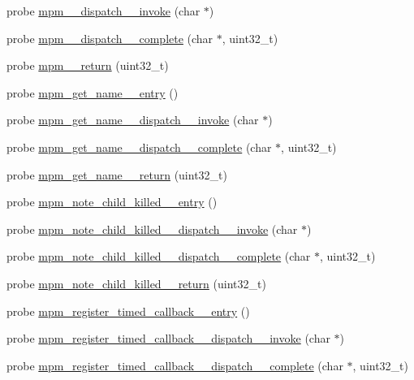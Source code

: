 \begin{DoxyCompactItemize}
\item 
probe \hyperlink{apache__probes_8d_a8e152825f105e3df19b568e1e9928b1d}{mpm\+\_\+\+\_\+dispatch\+\_\+\+\_\+invoke} (char $\ast$)
\item 
probe \hyperlink{apache__probes_8d_ae30fd1a26ab1cc9a489e66fb2812a6a2}{mpm\+\_\+\+\_\+dispatch\+\_\+\+\_\+complete} (char $\ast$, uint32\+\_\+t)
\item 
probe \hyperlink{apache__probes_8d_a5db8c32d33021094dc6b84aaee7dff3b}{mpm\+\_\+\+\_\+return} (uint32\+\_\+t)
\item 
probe \hyperlink{apache__probes_8d_a18460249d49260f04a3bffe61df15a20}{mpm\+\_\+get\+\_\+name\+\_\+\+\_\+entry} ()
\item 
probe \hyperlink{apache__probes_8d_a95717d031d2477163510b6ffd4e4e78b}{mpm\+\_\+get\+\_\+name\+\_\+\+\_\+dispatch\+\_\+\+\_\+invoke} (char $\ast$)
\item 
probe \hyperlink{apache__probes_8d_a68a2c5efe00c2a5c6d79ebd04a273fb3}{mpm\+\_\+get\+\_\+name\+\_\+\+\_\+dispatch\+\_\+\+\_\+complete} (char $\ast$, uint32\+\_\+t)
\item 
probe \hyperlink{apache__probes_8d_a55e51232195b97cbcf93f26dc6a870a4}{mpm\+\_\+get\+\_\+name\+\_\+\+\_\+return} (uint32\+\_\+t)
\item 
probe \hyperlink{apache__probes_8d_af2ec7faf474264c9a99c69f221579431}{mpm\+\_\+note\+\_\+child\+\_\+killed\+\_\+\+\_\+entry} ()
\item 
probe \hyperlink{apache__probes_8d_a21288220bcfa1d720595ff77a668eee8}{mpm\+\_\+note\+\_\+child\+\_\+killed\+\_\+\+\_\+dispatch\+\_\+\+\_\+invoke} (char $\ast$)
\item 
probe \hyperlink{apache__probes_8d_a6eca4314ac5073d03a6ab960b3a9db22}{mpm\+\_\+note\+\_\+child\+\_\+killed\+\_\+\+\_\+dispatch\+\_\+\+\_\+complete} (char $\ast$, uint32\+\_\+t)
\item 
probe \hyperlink{apache__probes_8d_a709659404226d7c1452a9f71f4270649}{mpm\+\_\+note\+\_\+child\+\_\+killed\+\_\+\+\_\+return} (uint32\+\_\+t)
\item 
probe \hyperlink{apache__probes_8d_af974d7dd895700e29dbbc8df10af69c8}{mpm\+\_\+register\+\_\+timed\+\_\+callback\+\_\+\+\_\+entry} ()
\item 
probe \hyperlink{apache__probes_8d_a28466d407749d2b0f94e8c6c3d8b0274}{mpm\+\_\+register\+\_\+timed\+\_\+callback\+\_\+\+\_\+dispatch\+\_\+\+\_\+invoke} (char $\ast$)
\item 
probe \hyperlink{apache__probes_8d_af1d973e06c810f9961f376a9554d6350}{mpm\+\_\+register\+\_\+timed\+\_\+callback\+\_\+\+\_\+dispatch\+\_\+\+\_\+complete} (char $\ast$, uint32\+\_\+t)

\end{DoxyCompactItemize}
